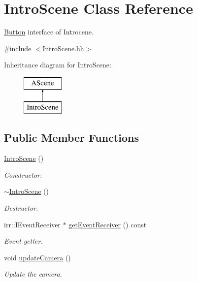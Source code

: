\hypertarget{classIntroScene}{}\section{Intro\+Scene Class Reference}
\label{classIntroScene}


\hyperlink{classButton}{Button} interface of Introcene.  




{\ttfamily \#include $<$Intro\+Scene.\+hh$>$}

Inheritance diagram for Intro\+Scene\+:\begin{figure}[H]
\begin{center}
\leavevmode
\includegraphics[height=2.000000cm]{classIntroScene}
\end{center}
\end{figure}
\subsection*{Public Member Functions}
\begin{DoxyCompactItemize}
\item 
\hyperlink{classIntroScene_a3691b51409f65b40f0c84008e49ef32b}{Intro\+Scene} ()
\begin{DoxyCompactList}\small\item\em Constructor. \end{DoxyCompactList}\item 
\hyperlink{classIntroScene_a7cdb50b55c0f5cf66b7bd151e4abe2b1}{$\sim$\+Intro\+Scene} ()
\begin{DoxyCompactList}\small\item\em Destructor. \end{DoxyCompactList}\item 
irr\+::\+I\+Event\+Receiver $\ast$ \hyperlink{classIntroScene_acabf925dab7b2a346edd398445cd5800}{get\+Event\+Receiver} () const
\begin{DoxyCompactList}\small\item\em Event getter. \end{DoxyCompactList}\item 
\mbox{\label{classIntroScene_aea7d58d3aab09737644be7d3f049338e}} 
void \hyperlink{classIntroScene_aea7d58d3aab09737644be7d3f049338e}{update\+Camera} ()
\begin{DoxyCompactList}\small\item\em Update the camera. \end{DoxyCompactList}\end{DoxyCompactItemize}


